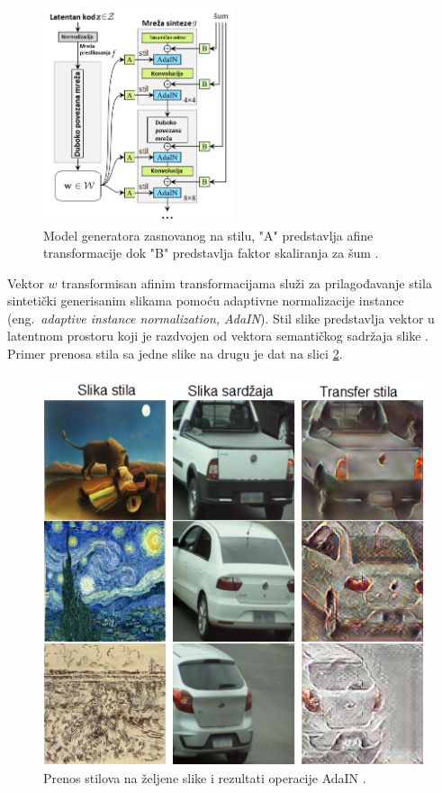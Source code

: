 \documentclass[12pt,oneside]{memoir}
\begin{document}
\begin{figure}[ht]
    \centering
    \includegraphics[width=0.5\textwidth]{matfmaster/glava2/stylegan_cus3.png}
    \caption{Model generatora zasnovanog na stilu, "A" predstavlja afine transformacije dok "B" predstavlja faktor skaliranja za šum \cite{karras2019style}. }
    \label{fig:section2_augmentation_stylegan}
\end{figure}


\clearpage
Vektor \(w\) transformisan afinim transformacijama služi za prilagođavanje stila sintetički generisanim slikama pomoću adaptivne normalizacije instance (eng.~\textit{adaptive instance normalization, AdaIN}). Stil slike predstavlja vektor u latentnom prostoru koji je razdvojen od vektora semantičkog sadržaja slike \cite{huang2017arbitrary}. Primer prenosa stila sa jedne slike na drugu je dat na slici \ref{fig:section2_augmentation_adain}.


\begin{figure}[ht]
    \centering
    \includegraphics[width=1\textwidth]{matfmaster/glava2/adain_cus.png}
    \caption{Prenos stilova na željene slike i rezultati operacije AdaIN \cite{huang2017arbitrary}. }
    \label{fig:section2_augmentation_adain}
\end{figure}
\end{document}

